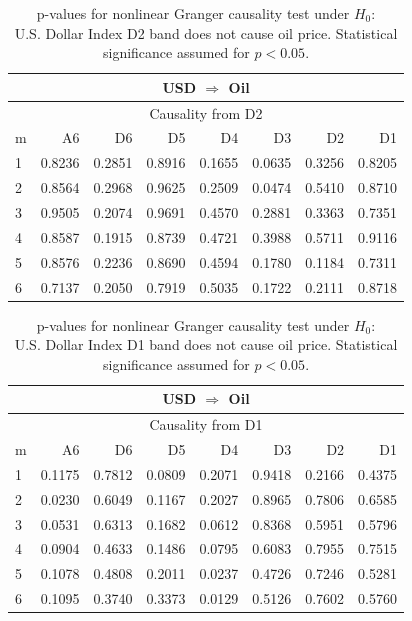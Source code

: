 %
%
\begin{table}[H]
\begin{center}
\begin{tabular}{l|r r r r r r r}
\hline\hline
\multicolumn{8}{c}{USD $\Rightarrow$ Oil}\\
\hline
\multicolumn{8}{c}{Causality from D2}\\
\hline\hline
m & A6 & D6 & D5 & D4 & D3 & D2 & D1 \\
\hline
1 & 0.8236 & 0.2851 & 0.8916 & 0.1655 & 0.0635 & 0.3256 & 0.8205 \\
2 & 0.8564 & 0.2968 & 0.9625 & 0.2509 & \cellcolor{mygrey}0.0474 & 0.5410 & 0.8710 \\
3 & 0.9505 & 0.2074 & 0.9691 & 0.4570 & 0.2881 & 0.3363 & 0.7351 \\
4 & 0.8587 & 0.1915 & 0.8739 & 0.4721 & 0.3988 & 0.5711 & 0.9116 \\
5 & 0.8576 & 0.2236 & 0.8690 & 0.4594 & 0.1780 & 0.1184 & 0.7311 \\
6 & 0.7137 & 0.2050 & 0.7919 & 0.5035 & 0.1722 & 0.2111 & 0.8718 \\
\hline\hline
\end{tabular}
\caption{p-values for nonlinear Granger causality test under $H_0$:\\
U.S. Dollar Index D2 band does not cause oil price. Statistical significance assumed for $p<0.05$.}
\end{center}
\end{table}

%
%
\begin{table}[H]
\begin{center}
\begin{tabular}{l|r r r r r r r}
\hline\hline
\multicolumn{8}{c}{USD $\Rightarrow$ Oil}\\
\hline
\multicolumn{8}{c}{Causality from D1}\\
\hline\hline
m & A6 & D6 & D5 & D4 & D3 & D2 & D1 \\
\hline
1 & 0.1175 & 0.7812 & 0.0809 & 0.2071 & 0.9418 & 0.2166 & 0.4375 \\
2 & \cellcolor{mygrey}0.0230 & 0.6049 & 0.1167 & 0.2027 & 0.8965 & 0.7806 & 0.6585 \\
3 & 0.0531 & 0.6313 & 0.1682 & 0.0612 & 0.8368 & 0.5951 & 0.5796 \\
4 & 0.0904 & 0.4633 & 0.1486 & 0.0795 & 0.6083 & 0.7955 & 0.7515 \\
5 & 0.1078 & 0.4808 & 0.2011 & \cellcolor{mygreen}0.0237 & 0.4726 & 0.7246 & 0.5281 \\
6 & 0.1095 & 0.3740 & 0.3373 & \cellcolor{mygreen}0.0129 & 0.5126 & 0.7602 & 0.5760 \\
\hline\hline
\end{tabular}
\caption{p-values for nonlinear Granger causality test under $H_0$:\\
U.S. Dollar Index D1 band does not cause oil price. Statistical significance assumed for $p<0.05$.}
\end{center}
\end{table}

